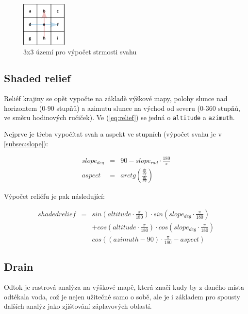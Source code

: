 \documentclass[12pt,a4paper,titlepage,final]{report}
\begin{document}
\begin{figure}[ht]
\begin{center}
\includegraphics[width=0.20\textwidth]{images/slope.pdf}
\caption{3x3 území pro výpočet strmosti svahu}
\label{fig:area}
\end{center}
\end{figure}

\pagebreak

\subsection{Shaded relief}

Reliéf krajiny se opět vypočte na základě výškové mapy, polohy slunce nad horizontem (0-90 stupňů) a azimutu slunce na východ od severu (0-360 stupňů, ve směru hodinových ručiček). Ve (\ref{eq:relief}) se jedná o \verb|altitude| a \verb|azimuth|.

Nejprve je třeba vypočítat svah a aspekt ve stupních (výpočet svahu je v \ref{subsec:slope}):

\begin{eqnarray*}
slope_{deg} &=& 90 - slope_{rad} \cdot \frac{180}{\pi} \\
aspect &=& arctg(\frac{\frac{dz}{dy}}{\frac{dz}{dx}})
\end{eqnarray*}

Výpočet reliéfu je pak následující:

\begin{eqnarray*}\label{eq:relief}
shaded relief &=& sin(altitude \cdot \frac{\pi}{180}) \cdot sin(slope_{deg} \cdot \frac{\pi}{180}) \\ & & + cos(altitude \cdot \frac{\pi}{180}) \cdot cos(slope_{deg} \cdot \frac{\pi}{180}) \\ & & cos((azimuth - 90) \cdot \frac{\pi}{180} - aspect)
\end{eqnarray*}

\clearpage

\subsection{Drain}

Odtok je rastrová analýza na výškové mapě, která značí kudy by z daného místa odtékala voda, což je nejen užitečné samo o sobě, ale je i základem pro spousty dalších analýz jako zjišťování záplavových oblastí.
\end{document}
